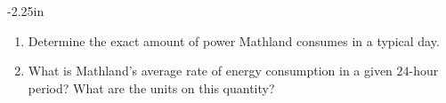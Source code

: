 \begin{adjustwidth*}{}{-2.25in}
\begin{multicols*}{2}
\begin{enumerate}[1),resume]
  		\item Determine the exact amount of power Mathland consumes in a typical day.  
		\item What is Mathland's average rate of energy consumption in a given $24$-hour period?  What are the units on this quantity?
	\ea
\end{enumerate}

\end{multicols*}
\end{adjustwidth*}

\afterexercises